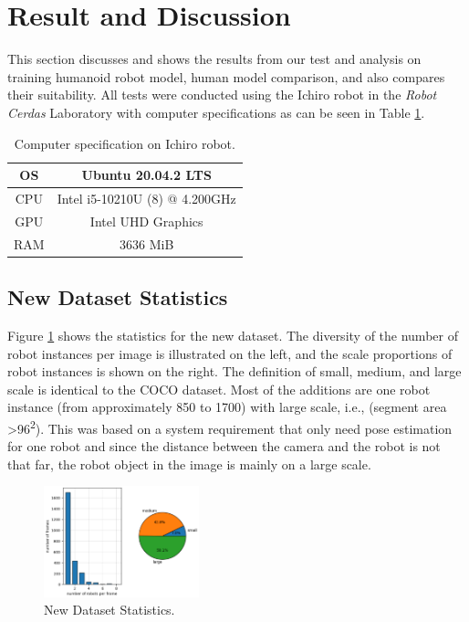 \section{Result and Discussion}
\label{sec:result-and-discussion}

This section discusses and shows the results from our test and analysis on training humanoid robot model, human model comparison, and also compares their suitability.
All tests were conducted using the Ichiro robot in the \emph{Robot Cerdas} Laboratory with computer specifications as can be seen in Table \ref{tb:computerspecichiro}.
\begin{table}
\caption{Computer specification on Ichiro robot.}
\centering
    \begin{tabular}{|c|c|}
    \hline
    OS      & Ubuntu 20.04.2 LTS \\
    \hline
    CPU     & Intel i5-10210U (8) @ 4.200GHz \\
    \hline
    GPU     & Intel UHD Graphics  \\
    \hline
    RAM     & 3636 MiB \\
    \hline
    \end{tabular}
    \label{tb:computerspecichiro}
\end{table}

\subsection{New Dataset Statistics}
\label{subsec:new-dataset-statistics}

Figure \ref{fig:new-dataset-statistics} shows the statistics for the new dataset.
The diversity of the number of robot instances per image is illustrated on the left, and the scale proportions of robot instances is shown on the right. The definition of small, medium, and large scale is identical to the COCO dataset.
Most of the additions are one robot instance (from approximately 850 to 1700) with large scale, i.e., (segment area \textgreater 96\textsuperscript{2}). 
This was based on a system requirement that only need pose estimation for one robot and since the distance between the camera and the robot is not that far, the robot object in the image is mainly on a large scale.
\begin{figure}[ht]
  \centering
  \includegraphics[width=0.4\textwidth]{gambar/new_dataset.png}
  \caption{New Dataset Statistics.}
  \label{fig:new-dataset-statistics}
\end{figure}


